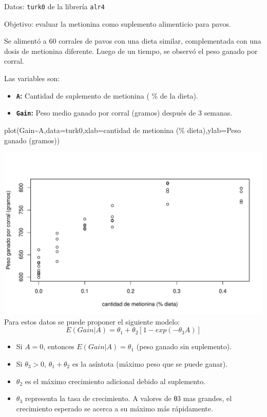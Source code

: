 \documentclass[
]{article}
\newenvironment{Shaded}{\begin{snugshade}}{\end{snugshade}}
\newcommand{\AttributeTok}[1]{\textcolor[rgb]{0.77,0.63,0.00}{#1}}
\newcommand{\FunctionTok}[1]{\textcolor[rgb]{0.00,0.00,0.00}{#1}}
\newcommand{\NormalTok}[1]{#1}
\newcommand{\SpecialCharTok}[1]{\textcolor[rgb]{0.00,0.00,0.00}{#1}}
\newcommand{\StringTok}[1]{\textcolor[rgb]{0.31,0.60,0.02}{#1}}
\providecommand{\tightlist}{%
  \setlength{\itemsep}{0pt}\setlength{\parskip}{0pt}}
\begin{document}
Datos: \texttt{turk0} de la librería \texttt{alr4}

Objetivo: evaluar la metionina como suplemento alimenticio para
pavos.

Se alimentó a 60 corrales de pavos con una dieta similar,
complementada con una dosis de metionina diferente. Luego de un
tiempo, se observó el peso ganado por corral.

Las variables son:

\begin{itemize}
\tightlist
\item
  \textbf{\texttt{A}:} Cantidad de suplemento de metionina ( \% de la dieta).
\item
  \textbf{\texttt{Gain}:} Peso medio ganado por corral (gramos) después de 3 semanas.
\end{itemize}

\begin{Shaded}
\begin{Highlighting}[]
\FunctionTok{plot}\NormalTok{(Gain}\SpecialCharTok{\textasciitilde{}}\NormalTok{A,}\AttributeTok{data=}\NormalTok{turk0,}\AttributeTok{xlab=}\StringTok{\textquotesingle{}cantidad de metionina (\% dieta)\textquotesingle{}}\NormalTok{,}\AttributeTok{ylab=}\StringTok{\textquotesingle{}Peso ganado (gramos)\textquotesingle{}}\NormalTok{)}
\end{Highlighting}
\end{Shaded}

\includegraphics{MLG2_files/figure-latex/plotpavos-1.pdf}
Para estos datos se puede proponer el siguiente modelo:
\[
E(Gain|A)=\theta_{1}+\theta_{2}[1-exp(-\theta_{3}A)]
\]

\begin{itemize}
\tightlist
\item
  Si \(A=0\), entonces \(E(Gain|A)=\theta_{1}\) (peso ganado sin suplemento).
\item
  Si \(\theta_{3}>0\), \(\theta_{1}+\theta_{2}\) es la asíntota (máximo peso que se puede
  ganar).
\item
  \(\theta_{2}\) es el máximo crecimiento adicional debido al suplemento.
\item
  \(\theta_{3}\) representa la tasa de crecimiento. A valores de θ3 mas
  grandes, el crecimiento esperado se acerca a su máximo más
  rápidamente.
\end{itemize}
\end{document}
